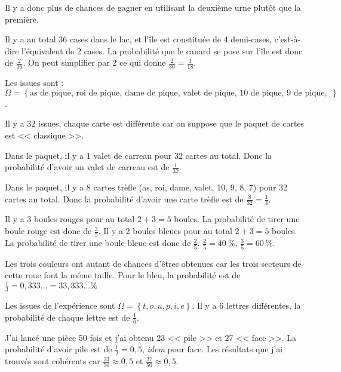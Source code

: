 \documentclass[../Cours.tex]{subfiles}
\begin{document}
\begin{questions}
    Il y a donc plus de chances de gagner en utilisant la deuxième urne plutôt que la première.

    \exercice 
    \question Il y a au total 36 cases dans le lac, et l'île est constituée de 4 demi-cases, c'est-à-dire l'équivalent de 2 cases. La probabilité que le canard se pose sur l'île est donc de $\frac{2}{36}$.
    \question On peut simplifier par 2 ce qui donne $\frac{2}{36} = \frac{1}{18}$.

    \exercice 
    \question Les issues sont : $\Omega = \left\{ \mbox{as de pique, roi de pique, dame de pique, valet de pique, 10 de pique, 9 de pique, 8 de pique, 7 de pique, as de trèfle, roi de trèfle, dame de trèfle, valet de trèfle, 10 de trèfle, 9 de trèfle, 8 de trèfle, 7 de trèfle, as de carreau, roi de carreau, dame de carreau, valet de carreau, 10 de carreau, 9 de carreau, 8 de carreau, 7 de carreau, as de coeur, roi de coeur, dame de coeur, valet de coeur, 10 de coeur, 9 de coeur, 8 de coeur, 7 de coeur} \right\}$.

    \question Il y a 32 issues, chaque carte est différente car on suppose que le paquet de cartes est << classique >>.
    
    \question Dans le paquet, il y a 1 valet de carreau pour 32 cartes au total. Donc la probabilité d'avoir un valet de carreau est de $\frac{1}{32}$.

    \question Dans le paquet, il y a 8 cartes trèfle (as, roi, dame, valet, 10, 9, 8, 7) pour 32 cartes au total. Donc la probabilité d'avoir une carte trèfle est de $\frac{8}{32} = \frac{1}{4}$.

    \exercice 
    \question Il y a 3 boules rouges pour au total $2+3=5$ boules. La probabilité de tirer une boule rouge est donc de $\frac{3}{5}$.
    \question Il y a 2 boules bleues pour au total $2+3=5$ boules. La probabilité de tirer une boule bleue est donc de $\frac{2}{5}$.
    \question $\frac{2}{5} = \qty{40}{\%}$, $\frac{3}{5} = \qty{60}{\%}$.

    \exercice 
    \question Les trois couleurs ont autant de chances d'êtres obtenues car les trois secteurs de cette roue font la même taille.
    \question Pour le bleu, la probabilité est de $\frac{1}{3} = 0,333... = 33,333... \%$

    \exercice 
    \question Les issues de l'expérience sont $\Omega = \left\{ t, o, u, p, i, e \right\}$.
    \question Il y a 6 lettres différentes, la probabilité de chaque lettre est de $\frac{1}{6}$.

    \exercice 
    \question J'ai lancé une pièce 50 fois et j'ai obtenu 23 << pile >> et 27 << face >>.
    \question La probabilité d'avoir pile est de $\frac{1}{2} = 0,5$, \textit{idem} pour face.
    \question Les résultats que j'ai trouvés sont cohérents car $\frac{23}{50} \approx 0,5$ et $\frac{27}{50} \approx 0,5$.


\end{questions}
\end{document}
